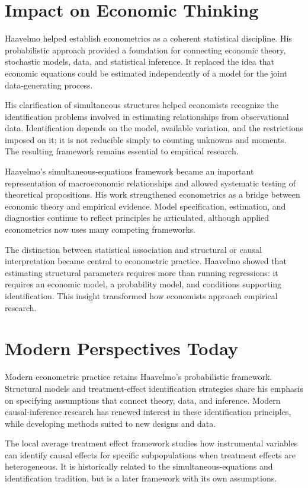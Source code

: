 \section{Impact on Economic Thinking}
Haavelmo helped establish econometrics as a coherent statistical discipline.
His probabilistic approach provided a foundation for connecting economic
theory, stochastic models, data, and statistical inference. It replaced the
idea that economic equations could be estimated independently of a model for
the joint data-generating process.

His clarification of simultaneous structures helped economists recognize the
identification problems involved in estimating relationships from observational
data. Identification depends on the model, available variation, and the
restrictions imposed on it; it is not reducible simply to counting unknowns
and moments. The resulting framework remains essential to empirical research.

Haavelmo's simultaneous-equations framework became an important representation
of macroeconomic relationships and allowed systematic testing of theoretical
propositions. His work strengthened econometrics as a bridge between economic
theory and empirical evidence. Model specification, estimation, and
diagnostics continue to reflect principles he articulated, although applied
econometrics now uses many competing frameworks.

The distinction between statistical association and structural or causal
interpretation became central to econometric practice. Haavelmo showed that
estimating structural parameters requires more than running regressions: it
requires an economic model, a probability model, and conditions supporting
identification. This insight transformed how economists approach empirical
research.

\section{Modern Perspectives Today}
Modern econometric practice retains Haavelmo's probabilistic framework.
Structural models and treatment-effect identification strategies share his
emphasis on specifying assumptions that connect theory, data, and inference.
Modern causal-inference research has renewed interest in these identification
principles, while developing methods suited to new designs and data.

The local average treatment effect framework studies how instrumental
variables can identify causal effects for specific subpopulations when
treatment effects are heterogeneous. It is historically related to the
simultaneous-equations and identification tradition, but is a later framework
with its own assumptions.

